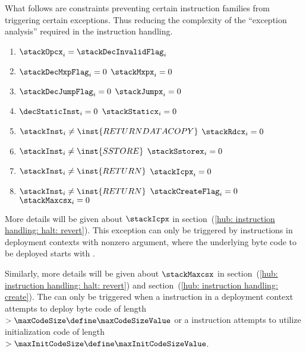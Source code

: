 \begin{center}
\end{center}
What follows are constraints preventing certain instruction families from triggering certain exceptions.
Thus reducing the complexity of the ``exception analysis'' required in the instruction handling.
\begin{enumerate}
	\item
		$\stackOpcx _{i} = \stackDecInvalidFlag _{i}$
	\item
		\If   $\stackDecMxpFlag _{i} = 0$
		\Then $\stackMxpx       _{i} = 0$
	\item
		\If   $\stackDecJumpFlag _{i} = 0$
		\Then $\stackJumpx       _{i} = 0$
	\item
		\If   $\decStaticInst _{i} = 0$
		\Then $\stackStaticx  _{i} = 0$
	\item
		\If   $\stackInst _{i} \neq \inst{RETURNDATACOPY}$
		\Then $\stackRdcx _{i} =    0$
	\item
		\If   $\stackInst    _{i} \neq \inst{SSTORE}$
		\Then $\stackSstorex _{i} =    0$
	\item
		\If   $\stackInst _{i} \neq \inst{RETURN}$
		\Then $\stackIcpx _{i} =    0$
	\item
		\If   $\stackInst   _{i} \neq \inst{RETURN}$ \et $\stackCreateFlag _{i} = 0$
		\Then $\stackMaxcsx _{i} =    0$
\end{enumerate}
\saNote{}
More details will be given about $\stackIcpx$ in section~(\ref{hub: instruction handling: halt: revert}).
This exception can only be triggered by  instructions in deployment contexts with nonzero  argument,
where the underlying byte code to be deployed starts with .

\saNote{}
Similarly, more details will be given about $\stackMaxcsx$ in
section~(\ref{hub: instruction handling: halt: revert}) and
section~(\ref{hub: instruction handling: create}).
The \maxcsxSH{} can only be triggered when
a     instruction in a deployment context attempts to deploy byte code of length $> \maxCodeSize     \define \maxCodeSizeValue$ or
a  instruction attempts to utilize initialization code of length              $> \maxInitCodeSize \define \maxInitCodeSizeValue$.
